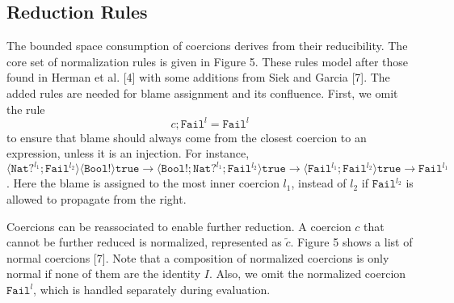 \subsection{Reduction Rules}
The bounded space consumption of coercions derives from their reducibility. 
The core set of normalization rules is given in Figure 5. These rules model 
after those found in Herman et al. [4] with some additions from Siek and Garcia [7]. 
The added rules are needed for blame assignment and its confluence. First, 
we omit the rule 
\begin{equation*}
    c;\texttt{Fail}^l = \texttt{Fail}^l
\end{equation*}
to ensure that blame should always come from the closest coercion to an 
expression, unless it is an injection. For instance, $\langle \texttt{Nat}?^{l_1};\texttt{Fail}^{l_2} 
\rangle \langle \texttt{Bool}! \rangle \texttt{true} \longrightarrow 
\langle \texttt{Bool}!;\texttt{Nat}?^{l_1};\texttt{Fail}^{l_2} \rangle \texttt{true}
\longrightarrow \langle \texttt{Fail}^{l_1};\texttt{Fail}^{l_2} \rangle \texttt{true}
\longrightarrow \texttt{Fail}^{l_1}$. Here the blame is assigned to the 
most inner coercion $l_1$, instead of $l_2$ 
if $\texttt{Fail}^{l_2}$ is allowed to propagate from the right. 

Coercions can be reassociated to enable further reduction. A coercion $c$ that 
cannot be further reduced is normalized, represented as $\tilde{c}$. Figure 
5 shows a list of normal coercions [7]. Note that a composition of normalized 
coercions is only normal if none of them are the identity $I$. Also, we omit 
the normalized coercion $\texttt{Fail}^l$, which is handled separately 
during evaluation. 




